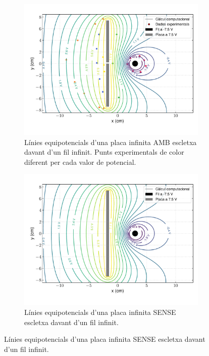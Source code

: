 \documentclass[11pt]{article}
\begin{document}
\begin{figure}[h]
    \centering
    \begin{subfigure}{0.495\textwidth}
        \centering
        \includegraphics[width=\textwidth]{lliure_combi_e_colors.pdf}
        \caption{Línies equipotencials d'una placa infinita AMB escletxa davant d'un fil infinit. Punts experimentals de color diferent per cada valor de potencial.}
        \label{fig: lliure_pot_e}
    \end{subfigure}
    \begin{subfigure}{0.495\textwidth} 
        \centering
        \includegraphics[width=\textwidth]{lliure_combi_0.pdf}
        \caption{Línies equipotencials d'una placa infinita SENSE escletxa davant d'un fil infinit.}
        \label{fig: lliure_pot_0}
    \end{subfigure}
\end{figure}
\end{document}
